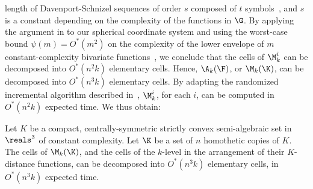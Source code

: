 length of Davenport-Schnizel sequences of order $s$ composed of $t$ symbols~\cite{SA}, 
and $s$ is a constant depending on the complexity of the functions in $\G$.
By applying the argument in \cite{KMRSS} to our spherical coordinate system and using
the worst-case bound $\psi(m) = O^*(m^2)$ on the complexity of the lower envelope
of $m$ constant-complexity bivariate functions~\cite{SA}, 
we conclude that the cells of $\M_k^i$ can be decomposed into $O^*(n^2k)$ elementary cells. 
Hence, $\A_k(\F)$, or $\M_k(\K)$, can be decomposed into $O^*(n^3k)$ elementary cells. 
By adapting the randomized incremental algorithm described in~\cite{KMRSS}, $\M_k^i$, for each 
$i$, can be computed in $O^*(n^2k)$ expected time. We thus obtain:
%
\begin{theorem} \label{thm:decomp}
Let $K$ be a compact, centrally-symmetric strictly convex semi-algebraic set in $\reals^3$ of constant 
complexity. Let $\K$ be a set of $n$ homothetic copies of $K$. The cells of $\M_k(\K)$, 
and the cells of the $k$-level in the arrangement of their $K$-distance 
functions, can be decomposed into $O^*(n^3k)$ elementary cells, in $O^*(n^3k)$ expected time.
\end{theorem}
%
